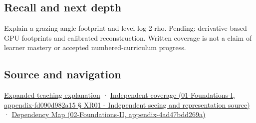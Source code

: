 \subsection{Recall and next depth}\label{recall-and-next-depth}

Explain a grazing-angle footprint and level log 2 rho. Pending: derivative-based GPU footprints and calibrated reconstruction. Written coverage is not a claim of learner mastery or accepted numbered-curriculum progress.

\subsection{Source and navigation}\label{source-and-navigation}

\href{Continuous\%20Notes/University\%20-\%20Worlds,\%20Images\%20and\%20Inference\%20-\%20Graphics,\%20Vision\%20and\%20Photography\#Multiresolution\%20work\%20must\%20preserve\%20the\%20right\%20information}{Expanded teaching explanation} · \href{}{Independent coverage (01-Foundations-I, appendix-fd090d982a15 § XR01 - Independent seeing and representation source)} · \href{}{Dependency Map (02-Foundations-II, appendix-4ad47bdd269a)}
